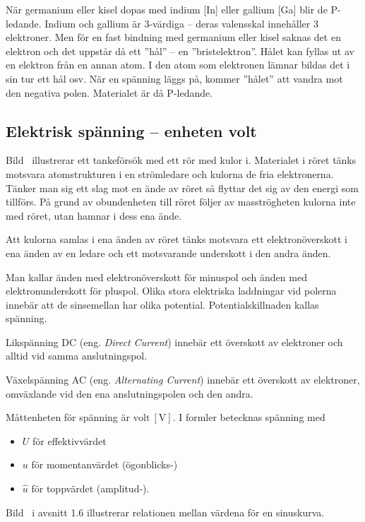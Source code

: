 När germanium eller kisel dopas med indium [In] eller gallium [Ga] blir de
P-ledande.
Indium och gallium är 3-värdiga -- deras valensskal innehåller 3 elektroner.
Men för en fast bindning med germanium eller kisel saknas det en elektron och
det uppstår då ett ''hål'' -- en ''bristelektron''.
Hålet kan fyllas ut av en elektron från en annan atom.
I den atom som elektronen lämnar bildas det i sin tur ett hål osv.
När en spänning läggs på, kommer ''hålet'' att vandra mot den negativa polen.
Materialet är då P-ledande.

\subsection{Elektrisk spänning -- enheten volt}
\label{spänning}


Bild~ illustrerar ett tankeförsök med ett rör med kulor i.
Materialet i röret tänks motsvara atomstrukturen i en strömledare och kulorna
de fria elektronerna.
Tänker man sig ett slag mot en ände av röret så flyttar det sig av den energi
som tillförs.
På grund av obundenheten till röret följer av masströgheten kulorna inte med
röret, utan hamnar i dess ena ände.

Att kulorna samlas i ena änden av röret tänks motsvara ett elektronöverskott i
ena änden av en ledare och ett motsvarande underskott i den andra änden.

Man kallar änden med elektronöverskott för minuspol och änden med
elektronunderskott för pluspol.
Olika stora elektriska laddningar vid polerna innebär att de sinsemellan har
olika potential.
Potentialskillnaden kallas spänning.

Likspänning DC (eng. \emph{Direct Current}) innebär ett överskott av elektroner
och alltid vid samma anslutningspol.

Växelspänning AC (eng. \emph{Alternating Current}) innebär ett överskott av
elektroner, omväxlande vid den ena anslutningspolen och den andra.

Måttenheten för spänning är \(\mathrm{volt\ [V]}\).
I formler betecknas spänning med
\begin{itemize}
  \item \(U\) för effektivvärdet
  \item \(u\) för momentanvärdet (ögonblicks-)
  \item \(\hat{u}\) för toppvärdet (amplitud-).
\end{itemize}
Bild~ i avsnitt 1.6 illustrerar relationen mellan värdena
för en sinuskurva.

